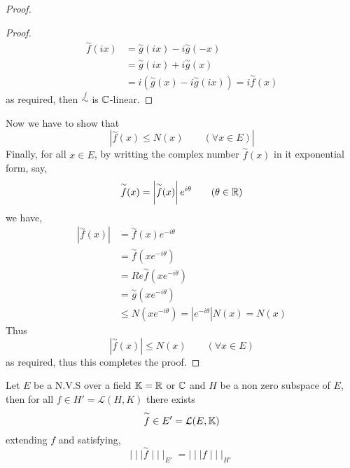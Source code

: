 \begin{proof}
\begin{proof}
\begin{align*}
	\overset{\sim}{f} (ix)  &= \overset{\sim}{g} (ix)  - 
	i \overset{\sim}{g} (-x)  \\
				&= 
		\overset{\sim}{g} (ix)  + i 
		\overset{\sim}{g} (x) \\
				&= i \left( 
					\overset{\sim}{g} (x)  -
					i \overset{\sim}{g} (ix) 
				\right) = i 
				\overset{\sim}{f} (x) 
\end{align*}
as required, then $ \overset{f}{\sim}  $ is $\mathbb{C}  $-linear.
\end{proof}
Now we have to show that 
\[
\left| 
\overset{\sim}{f}  (x)  \leq N(x)  \quad \quad  (\forall  x \in  E) 
\right|
\]
Finally, for all $x \in  E $, by writting the complex number
 $\overset{\sim}{f}(x)$ in it exponential form, say, 
 \[
 \overset{\sim}{f} (x)  = 
 \left| \overset{\sim}{f} (x)  \right| e^{i \theta} \quad \quad 
 (\theta \in  \mathbb{R} ) 
 \]
 we have, 
 \begin{align*}
 \left| 
 \overset{\sim}{f}(x)  
 \right| &= 
 \overset{\sim}{f} (x) e^{-i \theta} \\
	 &= 
	 \overset{\sim}{f} (x e^{-i \theta})  \\
	 &= 
	 Re \overset{\sim}{f} (x e^{-i \theta}) \\
	 &= 
	 \overset{\sim}{g} (x e^{-i \theta})  \\
	 & \leq 
	 N(xe^{-i \theta})  = \left| e^{-i \theta} \right| N(x)  = N(x) 
 \end{align*}
 Thus \[
 \left| \overset{\sim}{f} (x)  \right| \leq N(x) \quad \quad  (\forall  x \in  E) 
 \]
 as required, thus this completes the proof.
\end{proof}
\begin{theorem}
	Let $E $ be a N.V.S over a field $\mathbb{K} = \mathbb{R}  $ or $\mathbb{C}  $ and 
	$H $ be a non zero subspace of $E $, then for all $f \in  H'=
	\mathcal{L} (H,K) $ there exists 
	\[
	\overset{\sim}{f} \in  E' = 
	\mathcal{L} (E, \mathbb{K}) 
	\] 
	extending $f $ and satisfying, 
	\[  
		\mid \mid \mid  \overset{\sim}{f}  \mid \mid \mid _{E'}  =
		\mid \mid \mid  f \mid \mid \mid  _{H'}
	\]
\end{theorem}
